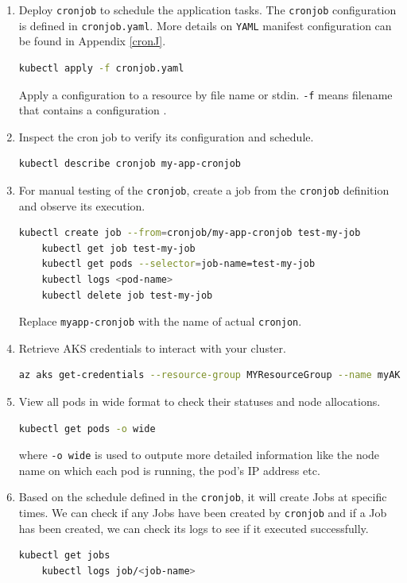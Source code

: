 \documentclass{article}
\begin{document}
\begin{enumerate}
    \item Deploy \texttt{cronjob} to schedule the application tasks. The \texttt{cronjob} configuration is defined in \texttt{cronjob.yaml}. More details on \texttt{YAML} manifest configuration can be found in Appendix \ref{cronJ}.
    
    \begin{lstlisting}[language=bash]
    kubectl apply -f cronjob.yaml
    \end{lstlisting}
Apply a configuration to a resource by file name or stdin.  \texttt{-f} means filename that contains a configuration \cite{kubecommands}.   
    \item Inspect the cron job to verify its configuration and schedule.
    
    \begin{lstlisting}[language=bash]
    kubectl describe cronjob my-app-cronjob
    \end{lstlisting}
    
    \item For manual testing of the \texttt{cronjob}, create a job from the \texttt{cronjob} definition and observe its execution.
    
    \begin{lstlisting}[language=bash]
    kubectl create job --from=cronjob/my-app-cronjob test-my-job
    kubectl get job test-my-job
    kubectl get pods --selector=job-name=test-my-job
    kubectl logs <pod-name>
    kubectl delete job test-my-job
    \end{lstlisting}
Replace \texttt{myapp-cronjob} with the name of actual \texttt{cronjon}.    
    \item Retrieve AKS credentials to interact with your cluster. 
    
    \begin{lstlisting}[language=bash]
    az aks get-credentials --resource-group MYResourceGroup --name myAKSCluster
    \end{lstlisting}
    
    \item View all pods in wide format to check their statuses and node allocations.
    
    \begin{lstlisting}[language=bash]
    kubectl get pods -o wide
    \end{lstlisting}
where \texttt{-o wide} is used to outpute more detailed information like the node name on which each pod is running, the pod's IP address etc.    
    \item Based on the schedule defined in the \texttt{cronjob}, it will create Jobs at specific times. We can check if any Jobs have been created by \texttt{cronjob} and if a Job has been created, we can check its logs to see if it executed successfully.
    
        \begin{lstlisting}[language=bash]
    kubectl get jobs
    kubectl logs job/<job-name>
    \end{lstlisting}
\end{enumerate}
\end{document}
